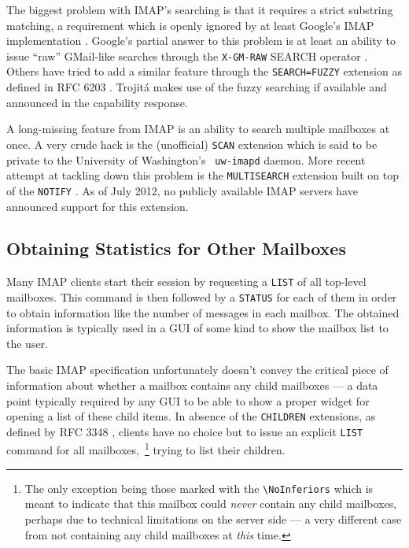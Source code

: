 \documentclass[trojita]{subfiles}
\begin{document}
The biggest problem with IMAP's searching is that it requires a strict substring matching, a requirement which is openly
ignored by at least Google's IMAP implementation \cite{gmail-imap-unsupported-features}.  Google's partial answer to
this problem is at least an ability to issue ``raw'' GMail-like searches through the {\tt X-GM-RAW} SEARCH operator
\cite{gmail-x-gm-raw}.  Others have tried to add a similar feature through the {\tt SEARCH=FUZZY} extension as defined
in RFC 6203 \cite{rfc6203}.  Trojitá makes use of the fuzzy searching if available and announced in the capability
response.

A long-missing feature from IMAP is an ability to search multiple mailboxes at once.  A very crude hack is the
(unofficial) {\tt SCAN} extension \cite{crispin-scan} which is said to be private to the University of Washington's {\tt
uw-imapd} daemon.  More recent attempt at tackling down this problem is the {\tt MULTISEARCH} extension \cite{rfc6237}
built on top of the {\tt NOTIFY} \cite{rfc5465}.  As of July 2012, no publicly available IMAP servers have announced
support for this extension.

\subsection{Obtaining Statistics for Other Mailboxes}

Many IMAP clients start their session by requesting a {\tt LIST} of all top-level mailboxes.  This command is then
followed by a {\tt STATUS} for each of them in order to obtain information like the number of messages in each mailbox.
The obtained information is typically used in a GUI of some kind to show the mailbox list to the user.

The basic IMAP specification unfortunately doesn't convey the critical piece of information about whether a mailbox
contains any child mailboxes --- a data point typically required by any GUI to be able to show a proper widget for
opening a list of these child items.  In absence of the {\tt CHILDREN} extensions, as defined by RFC 3348
\cite{rfc3348}, clients have no choice but to issue an explicit {\tt LIST} command for all mailboxes,~\footnote{The only
exception being those marked with the {\tt {\textbackslash}NoInferiors} which is meant to indicate that this mailbox
could {\em never} contain any child mailboxes, perhaps due to technical limitations on the server side --- a very
different case from not containing any child mailboxes at {\em this} time.} trying to list their children.
\end{document}
